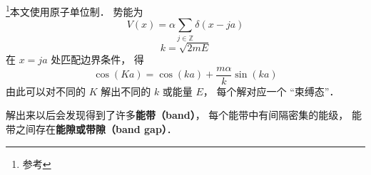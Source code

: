 

\footnote{参考\cite{GriffQ}}本文使用原子单位制． 势能为
\begin{equation}
V(x) = \alpha \sum_{j\in \mathbb Z} \delta(x - ja)
\end{equation}
\begin{equation}
k = \sqrt{2mE}
\end{equation}
在 $x = ja$ 处匹配边界条件， 得
\begin{equation}
\cos(K a) = \cos(ka) + \frac{m\alpha}{k}\sin(ka)
\end{equation}
由此可以对不同的 $K$ 解出不同的 $k$ 或能量 $E$， 每个解对应一个 “束缚态”．

解出来以后会发现得到了许多\textbf{能带（band）}， 每个能带中有间隔密集的能级， 能带之间存在\textbf{能隙或带隙（band gap）}．
